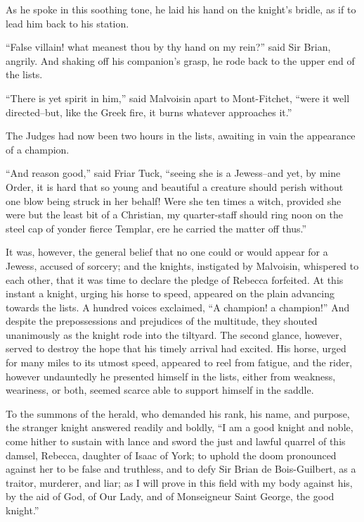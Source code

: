 As he spoke in this soothing tone, he laid his hand on the knight's
bridle, as if to lead him back to his station.

``False villain! what meanest thou by thy hand on my rein?'' said Sir
Brian, angrily. And shaking off his companion's grasp, he rode back to
the upper end of the lists.

``There is yet spirit in him,'' said Malvoisin apart to Mont-Fitchet,
``were it well directed--but, like the Greek fire, it burns whatever
approaches it.''

The Judges had now been two hours in the lists, awaiting in vain the
appearance of a champion.

``And reason good,'' said Friar Tuck, ``seeing she is a Jewess--and yet,
by mine Order, it is hard that so young and beautiful a creature should
perish without one blow being struck in her behalf! Were she ten times a
witch, provided she were but the least bit of a Christian, my
quarter-staff should ring noon on the steel cap of yonder fierce
Templar, ere he carried the matter off thus.''

It was, however, the general belief that no one could or would appear
for a Jewess, accused of sorcery; and the knights, instigated by
Malvoisin, whispered to each other, that it was time to declare the
pledge of Rebecca forfeited. At this instant a knight, urging his horse
to speed, appeared on the plain advancing towards the lists. A hundred
voices exclaimed, ``A champion! a champion!'' And despite the
prepossessions and prejudices of the multitude, they shouted unanimously
as the knight rode into the tiltyard. The second glance, however, served
to destroy the hope that his timely arrival had excited. His horse,
urged for many miles to its utmost speed, appeared to reel from fatigue,
and the rider, however undauntedly he presented himself in the lists,
either from weakness, weariness, or both, seemed scarce able to support
himself in the saddle.

To the summons of the herald, who demanded his rank, his name, and
purpose, the stranger knight answered readily and boldly, ``I am a good
knight and noble, come hither to sustain with lance and sword the just
and lawful quarrel of this damsel, Rebecca, daughter of Isaac of York;
to uphold the doom pronounced against her to be false and truthless, and
to defy Sir Brian de Bois-Guilbert, as a traitor, murderer, and liar; as
I will prove in this field with my body against his, by the aid of God,
of Our Lady, and of Monseigneur Saint George, the good knight.''

